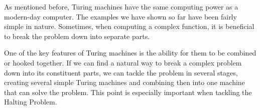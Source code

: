 \documentclass[../../include/open-logic-section]{subfiles}
\begin{document}

\begin{explain}
As mentioned before, Turing machines have the same computing
power as a modern-day computer. The examples we have shown
so far have been fairly simple in nature. Sometimes, when computing
a complex function, it is beneficial to break the problem down into 
separate parts.

One of the key features of Turing machines is the ability for them to
be combined or hooked together. If we can find a natural way to break
a complex problem down into its constituent parts, we can tackle the
problem in several stages, creating several simple Turing machines and
combining then into one machine that can solve the problem. This point
is especially important when tackling the Halting Problem.
\end{explain}
\end{document}
